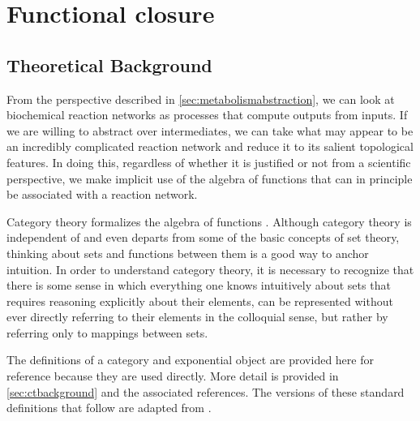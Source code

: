 \documentclass[10pt]{article}
\theoremstyle{plain}
\theoremstyle{definition}
\theoremstyle{remark}
\begin{document}
\section{Functional closure}\label{sec:functionalclosure}

\subsection{Theoretical Background}

From the perspective described in
\ref{sec:metabolismabstraction},
we can look at biochemical reaction networks as processes that compute outputs from inputs. If we are willing to abstract over intermediates, we can take what may appear to be an incredibly complicated reaction network and reduce it to its salient topological features. In doing this, regardless of whether it is justified or not from a scientific perspective, we make implicit use of the algebra of functions that can in principle be associated with a reaction network.

Category theory formalizes the algebra of functions \cite{Lane1998,Lawvere2003,Awodey2006}. Although category theory is independent of and even departs from some of the basic concepts of set theory, thinking about sets and functions between them is a good way to anchor intuition.  In order to understand category theory, it is necessary to recognize that there is some sense in which everything one knows intuitively about sets that requires reasoning explicitly about their elements, can be represented without ever directly referring to their elements in the colloquial sense, but rather by referring only to mappings between sets.

The definitions of a category and exponential object are provided here for reference because they are used directly. More detail is provided in \ref{sec:ctbackground} and the associated references. The versions of these standard definitions that follow are adapted from \cite{Planetmath}.

\end{document}
